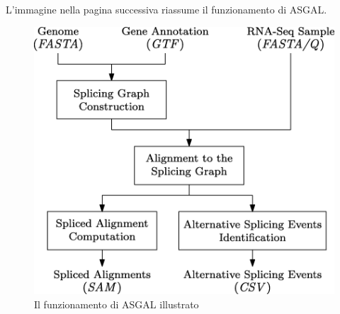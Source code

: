 L'immagine nella pagina successiva riassume il funzionamento di ASGAL.

\begin{figure}[h!]
	\includegraphics[width=\textwidth]{images/asgal.png}
  \caption{Il funzionamento di ASGAL illustrato}
  \label{fig:ASGAL}
\end{figure}
